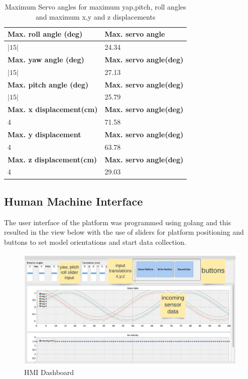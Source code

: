 \begin{center}
	\begin{table}[H]
	\centering
	\caption{Maximum Servo angles for maximum yap,pitch, roll angles and maximum x,y and z displacements}
	\label{roll}
	\centering
	\begin{tabular}{|l|l|}
	\hline
	\textbf{Max. roll angle (deg)}& \textbf{Max. servo angle} \\
	\hline
	 $|15|$& 24.34\\
	 \hline
\textbf{Max. yaw angle (deg)}& \textbf{Max. servo angle(deg)}\\
	\hline
	$|15|$& 27.13\\
	\hline
	\textbf{Max. pitch angle (deg)}& \textbf{Max. servo angle(deg)}\\
	\hline
	$|15|$& 25.79 \\
	\hline
	\textbf{Max. x displacement(cm)} & \textbf{Max. servo angle(deg)}\\
	\hline
	4 & 71.58 \\
	\hline
	\textbf{Max. y displacement} & \textbf{Max. servo angle(deg)}\\
	\hline
	4	& 63.78\\
	\hline
	\textbf{Max. z displacement(cm)} & \textbf{Max. servo angle(deg)}\\
	\hline
	4	& 29.03\\
	\hline
	\end{tabular}
\end{table}
\end{center}

\subsection{Human Machine Interface}
The user interface of the platform was programmed using golang and this resulted in the view below with the use of sliders for platform positioning and buttons to set model orientations and start data collection.
\begin{center}
	\begin{figure}[H]
	\centering
	\includegraphics[width=1\linewidth]{Figures/hmi}
	\caption[HMI Dashboard]{HMI Dashboard}
	\end{figure}
\end{center}

